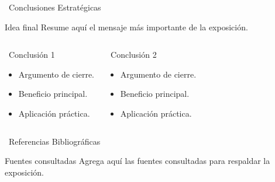 \documentclass[10pt, aspectratio=169]{beamer}
\begin{document}
\begin{frame}{\faCheckCircle \ Conclusiones Estratégicas}
  \begin{block}{Idea final}
    Resume aquí el mensaje más importante de la exposición.
  \end{block}

  \begin{columns}[T]
    \begin{exampleblock}{\faBullhorn \ Conclusión 1}
      \footnotesize
      \begin{itemize}
        \item Argumento de cierre.
        \item Beneficio principal.
        \item Aplicación práctica.
      \end{itemize}
    \end{exampleblock}

    \begin{exampleblock}{\faTools \ Conclusión 2}
      \footnotesize
      \begin{itemize}
        \item Argumento de cierre.
        \item Beneficio principal.
        \item Aplicación práctica.
      \end{itemize}
    \end{exampleblock}
  \end{columns}
\end{frame}

\expositor{\Grupo}
\begin{frame}{\faBook \ Referencias Bibliográficas}
  \begin{block}{Fuentes consultadas}
    \justifying
    \footnotesize
    Agrega aquí las fuentes consultadas para respaldar la exposición.
  \end{block}

  
\end{frame}

\end{document}
